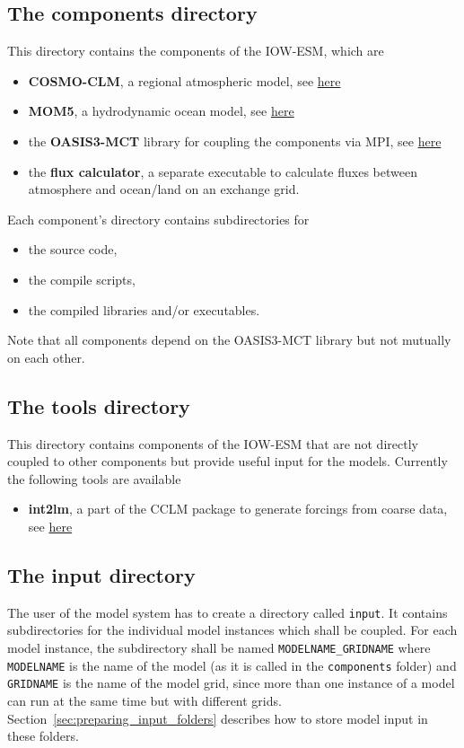 \documentclass[a4paper,titlepage]{scrartcl}
\begin{document}
\subsection{The components directory}
This directory contains the components of the IOW-ESM, which are
\begin{itemize}
\item \textbf{COSMO-CLM}, a regional atmospheric model, see \href{https://wiki.coast.hereon.de/clmcom/}{here}
\item \textbf{MOM5}, a hydrodynamic ocean model, see \href{https://mom-ocean.github.io/}{here}
\item the \textbf{OASIS3-MCT} library for coupling the components via MPI, see \href{https://oasis.cerfacs.fr/en/}{here}
\item the \textbf{flux calculator}, a separate executable to calculate fluxes between atmosphere and ocean/land on an exchange grid.
\end{itemize}

Each component's directory contains subdirectories for
\begin{itemize}
\item the source code,
\item the compile scripts,
\item the compiled libraries and/or executables.
\end{itemize}

Note that all components depend on the OASIS3-MCT library but not mutually on each other.

\subsection{The tools directory}
This directory contains components of the IOW-ESM that are not directly coupled to other components but provide useful input for the models.
Currently the following tools are available
\begin{itemize}
\item \textbf{int2lm}, a part of the CCLM package to generate forcings from coarse data, see \href{https://wiki.coast.hereon.de/clmcom/}{here}
\end{itemize}
 

\subsection{The input directory}
The user of the model system has to create a directory called \texttt{input}.
It contains subdirectories for the individual model instances which shall be coupled.
For each model instance, the subdirectory shall be named \texttt{\color{red}MODELNAME\color{black}\_\color{red}GRIDNAME} where \texttt{\color{red}MODELNAME} is the name of the model (as it is called in the \texttt{components} folder) and \texttt{\color{red}GRIDNAME} is the name of the model grid, since more than one instance of a model can run at the same time but with different grids.
Section~\ref{sec:preparing_input_folders} describes how to store model input in these folders.
\end{document}
